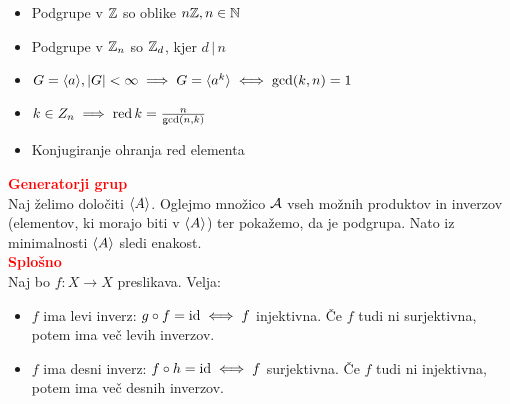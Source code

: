 \documentclass[a4paper,oneside,8pt,landscape]{extarticle}
\begin{document}
\begin{multicols*}{3}
\begin{itemize}
    \item Podgrupe v \(\mathbb{Z}\) so oblike \(n\mathbb{Z}, n \in \mathbb{N}\)
    \item Podgrupe v \(\mathbb{Z}_n\) so \(\mathbb{Z}_d\), kjer \(d\, |\, n\)
    \item \(G = \langle {a} \rangle, |G| < \infty \implies G = \langle {a^k} \rangle \iff \gcd (k, n) = 1\)
    \item \(k \in Z_n \implies \operatorname{red} k = \frac{n}{\gcd(n, k)}\)
    \item Konjugiranje ohranja red elementa
\end{itemize}
%
%
\textbf{\textcolor{red}{Generatorji grup}}\\
Naj želimo določiti \(\langle {A} \rangle\). Oglejmo množico \(\mathcal{A}\) vseh možnih produktov in inverzov (elementov, ki morajo biti v \(\langle {A} \rangle\)) ter pokažemo, da je podgrupa. Nato iz minimalnosti \(\langle {A} \rangle\) sledi enakost.\\
%
%
\textbf{\textcolor{red}{Splošno}}\\
Naj bo \(f: X \to X\) preslikava. Velja:
\begin{itemize}
    \item \(f\) ima levi inverz: \(g \circ f = \operatorname{id} \iff f\) injektivna. Če \(f\) tudi ni surjektivna, potem ima več levih inverzov.
    \item \(f\) ima desni inverz: \(f \circ h = \operatorname{id} \iff f\) surjektivna. Če \(f\) tudi ni injektivna, potem ima več desnih inverzov.        
\end{itemize}


\end{multicols*}
\end{document}
